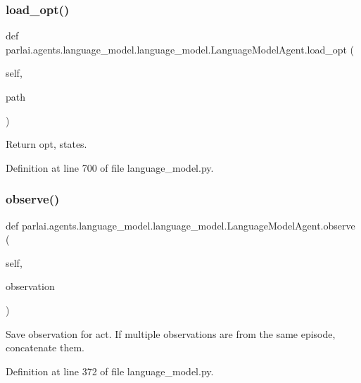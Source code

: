 \subsubsection{\texorpdfstring{load\+\_\+opt()}{load\_opt()}}
{\footnotesize\ttfamily def parlai.\+agents.\+language\+\_\+model.\+language\+\_\+model.\+Language\+Model\+Agent.\+load\+\_\+opt (\begin{DoxyParamCaption}\item[{}]{self,  }\item[{}]{path }\end{DoxyParamCaption})}

\begin{DoxyVerb}Return opt, states.\end{DoxyVerb}
 

Definition at line 700 of file language\+\_\+model.\+py.

\mbox{\label{classparlai_1_1agents_1_1language__model_1_1language__model_1_1LanguageModelAgent_a78df1c525c94c4cc68e05cd44ee374fd}} 
\subsubsection{\texorpdfstring{observe()}{observe()}}
{\footnotesize\ttfamily def parlai.\+agents.\+language\+\_\+model.\+language\+\_\+model.\+Language\+Model\+Agent.\+observe (\begin{DoxyParamCaption}\item[{}]{self,  }\item[{}]{observation }\end{DoxyParamCaption})}

\begin{DoxyVerb}Save observation for act.
If multiple observations are from the same episode, concatenate them.
\end{DoxyVerb}
 

Definition at line 372 of file language\+\_\+model.\+py.



